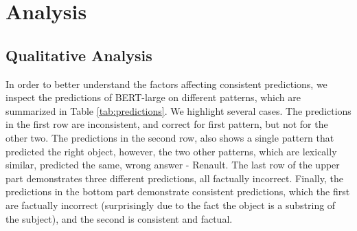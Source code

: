 \section{Analysis}
\label{sec:analysis}







\subsection{Qualitative Analysis}
In order to better understand the factors affecting consistent predictions, we inspect the predictions of BERT-large on different patterns, which are summarized in Table \ref{tab:predictions}.
We highlight several cases.
The predictions in the first row are inconsistent, and correct for first pattern, but not for the other two. 
The predictions in the second row, also shows a single pattern that predicted the right object, however, the two other patterns, which are lexically similar, predicted the same, wrong answer - Renault.
The last row of the upper part demonstrates three different predictions, all factually incorrect. 
Finally, the predictions in the bottom part demonstrate consistent predictions, which the first are factually incorrect (surprisingly due to the fact the object is a substring of the subject), and the second is consistent and factual.





